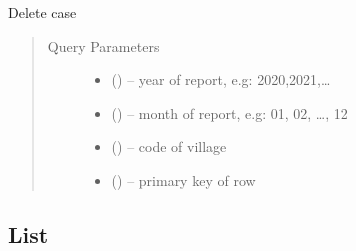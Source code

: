 \documentclass[letterpaper,10pt,english,openany,oneside]{sphinxmanual}
\begin{document}
\begin{fulllineitems}
\label{\detokenize{api/v4:post--api4-Reports-delete_vmw_activity_case}}
\sphinxAtStartPar
Delete case
\begin{quote}\begin{description}
\item[{Query Parameters}] \leavevmode\begin{itemize}
\item {} 
\sphinxAtStartPar
{} () – year of report, e.g: 2020,2021,…

\item {} 
\sphinxAtStartPar
{} () – month of report, e.g: 01, 02, …, 12

\item {} 
\sphinxAtStartPar
{} () – code of village

\item {} 
\sphinxAtStartPar
{} () – primary key of row

\end{itemize}

\end{description}\end{quote}

\end{fulllineitems}



\subsection{List}
\label{\detokenize{api/v4:id4}}
\end{document}
